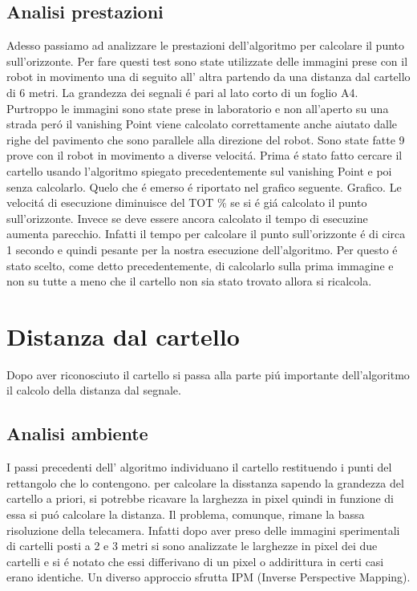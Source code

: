 	\subsection{Analisi prestazioni}
		Adesso passiamo ad analizzare le prestazioni dell'algoritmo per calcolare il punto sull'orizzonte. \newline
		Per fare questi test sono state utilizzate delle immagini prese con il robot in movimento una di seguito all' altra partendo da una distanza dal cartello di 6 metri. La grandezza dei segnali \'e pari al lato corto di un foglio A4. Purtroppo le immagini sono state prese in laboratorio e non all'aperto su una strada per\'o il vanishing Point viene calcolato correttamente anche aiutato dalle righe del pavimento che sono parallele alla direzione del robot. Sono state fatte 9 prove con il robot in movimento a diverse velocit\'a. Prima \'e stato fatto cercare il cartello usando l'algoritmo spiegato precedentemente sul vanishing Point e poi senza calcolarlo. Quelo che \'e emerso \'e riportato nel grafico seguente.
		Grafico.
		Le velocit\'a di esecuzione diminuisce del TOT \% se si \'e gi\'a calcolato il punto sull'orizzonte. Invece se deve essere ancora calcolato il tempo di esecuzine aumenta parecchio. Infatti il tempo per calcolare il punto sull'orizzonte \'e di circa 1 secondo e quindi pesante per la nostra esecuzione dell'algoritmo. Per questo \'e stato scelto, come detto precedentemente, di calcolarlo sulla prima immagine e non su tutte a meno che il cartello non sia stato trovato allora si ricalcola.

\section{Distanza dal cartello}
	
	Dopo aver riconosciuto il cartello si passa alla parte pi\'u importante dell'algoritmo il calcolo della distanza dal segnale.

	\subsection{Analisi ambiente}

		I passi precedenti dell' algoritmo individuano il cartello restituendo i punti del rettangolo che lo contengono. per calcolare la disstanza sapendo la grandezza del cartello a priori, si potrebbe ricavare la larghezza in pixel quindi in funzione di essa si pu\'o calcolare la distanza. Il problema, comunque, rimane la bassa risoluzione della telecamera. Infatti dopo aver preso delle immagini sperimentali di cartelli posti a 2 e 3 metri si sono analizzate le larghezze in pixel dei due cartelli e si \'e notato che essi differivano di un pixel o addirittura in certi casi erano identiche. Un diverso approccio sfrutta IPM (Inverse Perspective Mapping).
		
